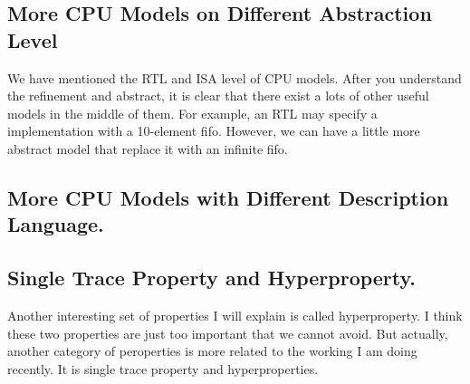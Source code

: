 \documentclass{article}
\begin{document}
\subsection{More CPU Models on Different Abstraction Level}

We have mentioned the RTL and ISA level of CPU models.
After you understand the refinement and abstract, it is clear that there exist a lots of other useful models in the middle of them.
For example, an RTL may specify a implementation with a 10-element fifo.
However, we can have a little more abstract model that replace it with an infinite fifo.





\subsection{More CPU Models with Different Description Language.}







\subsection{Single Trace Property and Hyperproperty.}

Another interesting set of properties I will explain is called hyperproperty.
I think these two properties are just too important that we cannot avoid.
But actually, another category of peroperties is more related to the working I am doing recently.
It is single trace property and hyperproperties.







\end{document}

